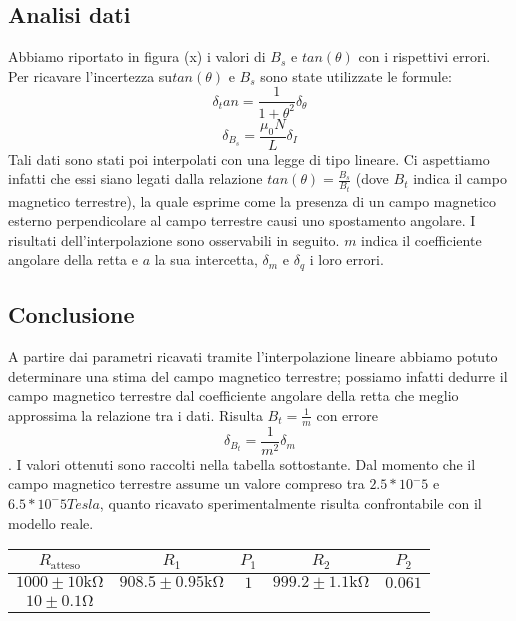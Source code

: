 \documentclass[a4paper]{article}
\begin{document}
\subsection{Analisi dati}
Abbiamo riportato in figura (x) i valori di \( \mathit{B_s} \) e \( \mathit{tan(\theta)} \) con i rispettivi errori.
Per ricavare l'incertezza su\( \mathit{tan(\theta)} \) e \( \mathit{B_s} \) sono state utilizzate le formule:
\[ \delta_tan = \frac {1}{1+\theta^2}\delta_\theta \]
\[ \delta_{B_s} = \frac {\mu_0N}{L}\delta_I \]
Tali dati sono stati poi interpolati con una legge di tipo lineare.
Ci aspettiamo infatti che essi siano legati dalla relazione \( tan(\theta) = \frac {B_s}{B_t} \) (dove \( \mathit{B_t} \) indica il campo magnetico terrestre),
la quale esprime come la presenza di un campo magnetico esterno perpendicolare al campo terrestre causi uno spostamento angolare.
I risultati dell'interpolazione sono osservabili in seguito.
\( \mathit{m} \) indica il coefficiente angolare della retta e \( \mathit{a} \) la sua intercetta,
\( \mathit{\delta_m} \) e \( \mathit{\delta_q} \) i loro errori.
\subsection{Conclusione}
A partire dai parametri ricavati tramite l'interpolazione lineare abbiamo potuto determinare una stima del campo magnetico terrestre;
possiamo infatti dedurre il campo magnetico terrestre dal coefficiente angolare della retta che meglio approssima la relazione tra i dati.
Risulta \( B_t = \frac {1}{m} \) con errore \[ \delta_{B_t} = \frac {1}{m^2}\delta_m \].
I valori ottenuti sono raccolti nella tabella sottostante.
Dal momento che il campo magnetico terrestre assume un valore compreso tra \( \mathit{2.5*10^-5} \) e \( \mathit{6.5*10^-5 Tesla} \),
quanto ricavato sperimentalmente risulta confrontabile con il modello reale.












\centering
\begin{tabular}{|c|c|c|c|c|}
	\hline
	$R_{\text{atteso}}$            & $R_1$                           & $P_1$ & $R_2$ & $P_2$ \\
	\hline
	$1000 \pm 10 \si{\kilo\ohm}$   & $908.5 \pm 0.95 \si{\kilo\ohm}$ & $1$   &
	$999.2 \pm 1.1 \si{\kilo\ohm}$ & $0.061$                                                 \\
	\hline
	$10 \pm 0.1 \si{\ohm}$         &                                 &       &       &       \\
	\hline
\end{tabular}
\label{tab:Verfica legge di Ohm}



\subsection{}
\end{document}

